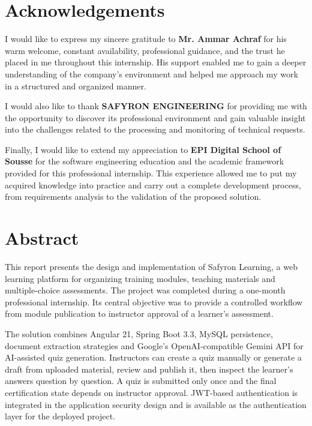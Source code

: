 ﻿\documentclass[12pt,a4paper,openright]{report}
\newcommand{\projectname}{Safyron Learning}
\begin{document}
\chapter*{Acknowledgements}
\begin{center}
\vspace*{0.65cm}
\begin{minipage}{0.82\textwidth}
\sffamily
\large
\setlength{\parindent}{0pt}
\setlength{\parskip}{1.05em}
\setlength{\baselineskip}{1.35\baselineskip}
\justifying
I would like to express my sincere gratitude to \textbf{Mr. Ammar Achraf}
for his warm welcome, constant availability, professional guidance, and the
trust he placed in me throughout this internship. His support enabled me to
gain a deeper understanding of the company’s environment and helped me
approach my work in a structured and organized manner.

I would also like to thank \textbf{SAFYRON ENGINEERING} for providing me
with the opportunity to discover its professional environment and gain
valuable insight into the challenges related to the processing and monitoring
of technical requests.

Finally, I would like to extend my appreciation to
\textbf{EPI Digital School of Sousse} for the software engineering education
and the academic framework provided for this professional internship. This
experience allowed me to put my acquired knowledge into practice and carry out
a complete development process, from requirements analysis to the validation
of the proposed solution.
\end{minipage}
\end{center}

\chapter*{Abstract}
This report presents the design and implementation of \projectname{}, a web
learning platform for organizing training modules, teaching materials and
multiple-choice assessments. The project was completed during a one-month
professional internship. Its central objective was to provide a controlled
workflow from module publication to instructor approval of a learner's
assessment.

The solution combines Angular 21, Spring Boot 3.3, MySQL persistence,
document extraction strategies and Google's OpenAI-compatible Gemini API for
AI-assisted quiz generation. Instructors can create a quiz manually or
generate a draft from uploaded material, review and publish it, then inspect
the learner's answers question by question. A quiz is submitted only once and
the final certification state depends on instructor approval. JWT-based
authentication is integrated in the application security design and is
available as the authentication layer for the deployed project.
\end{document}
